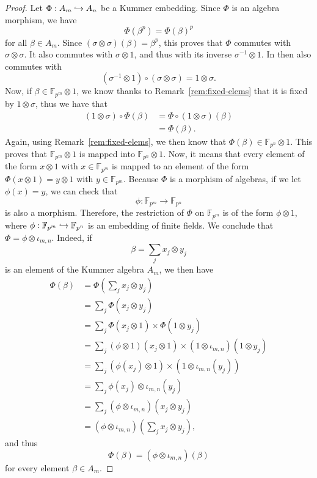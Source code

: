 \begin{proof}
 Let $\Phi:A_m\hookrightarrow A_n$ be a Kummer embedding. Since $\Phi$ is an algebra
 morphism, we have 
 \[
   \Phi(\beta^p) = \Phi(\beta)^p
 \]
for all $\beta\in A_m$. Since $(\sigma\otimes\sigma)(\beta) = \beta^p$, this
proves that $\Phi$ commutes with $\sigma\otimes\sigma$. It also
commutes with $\sigma\otimes1$, and thus with its inverse $\sigma^{-1}\otimes1$.
In then also commutes with
\[
  (\sigma^{-1}\otimes1)\circ(\sigma\otimes\sigma) = 1\otimes\sigma.
\]
Now, if $\beta\in\mathbb{F}_{p^m}\otimes1$, we know thanks
to Remark~\ref{rem:fixed-elems} that it is fixed by $1\otimes\sigma$, thus we have that
\begin{align*}
 (1\otimes\sigma)\circ\Phi(\beta) &= \Phi\circ(1\otimes\sigma)(\beta)\\
 &= \Phi(\beta).
\end{align*}
Again, using Remark~\ref{rem:fixed-elems}, we then know that
$\Phi(\beta)\in\mathbb{F}_{p^n}\otimes1$. This proves that
$\mathbb{F}_{p^m}\otimes1$ is mapped into $\mathbb{F}_{p^n}\otimes1$. Now, it
means that every element of the form $x\otimes1$ with $x\in\mathbb{F}_{p^m}$ is
mapped to an element of the form $\Phi(x\otimes1)=y\otimes1$ with $y\in\mathbb{F}_{p^m}$.
Because $\Phi$ is a morphism of algebras, if we
let $\phi(x)=y$, we can check that
\[
  \phi:\mathbb{F}_{p^m}\to\mathbb{F}_{p^n}
\]
is also a morphism. Therefore, the restriction of $\Phi$ on
$\mathbb{F}_{p^m}$ is of the form $\phi\otimes1$, where
$\phi:\mathbb{F}_{p^m}\hookrightarrow\mathbb{F}_{p^n}$ is an embedding
of finite fields. We conclude that $\Phi=\phi\otimes\iota_{m, n}$. Indeed, if 
\[
  \beta=\sum_{j}x_j\otimes y_j
\]
is an element of the Kummer algebra $A_m$, we then have
\begin{align*}
  \Phi(\beta) &= \Phi(\sum_{j}x_j\otimes y_j) \\
  &= \sum_j\Phi(x_j\otimes y_j)\\
  &= \sum_j\Phi(x_j\otimes1)\times\Phi(1\otimes y_j)\\
  &= \sum_j(\phi\otimes1)(x_j\otimes1)\times(1\otimes\iota_{m, n})(1\otimes y_j)\\
  &= \sum_j (\phi(x_j)\otimes1)\times(1\otimes\iota_{m, n}(y_j))\\
  &= \sum_j \phi(x_j)\otimes\iota_{m, n}(y_j)\\
  &= \sum_j (\phi\otimes\iota_{m, n})(x_j\otimes y_j)\\
  &= (\phi\otimes\iota_{m, n})(\sum_jx_j\otimes y_j),
\end{align*}
and thus
\[
  \Phi(\beta) = (\phi\otimes\iota_{m, n})(\beta)
\]
for every element $\beta\in A_m$.


\end{proof}
